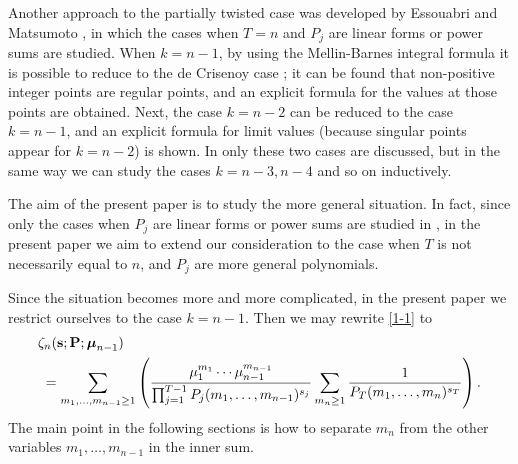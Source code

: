 \documentclass[a4paper,12pt]{article}
\theoremstyle{definition}
\numberwithin{equation}{section}
\begin{document}
Another approach to the partially twisted case was developed by Essouabri and 
Matsumoto \cite{CMUSP}, 
in which the cases when $T=n$ and $P_j$ are linear forms or power sums are studied.
When $k=n-1$, by using the Mellin-Barnes integral formula it is possible to reduce to the
de Crisenoy case \cite{dC}; it can be found that non-positive integer points are regular points, and
an explicit formula for the values at those points are obtained.   Next, the case $k=n-2$ 
can be reduced to the case $k=n-1$, and an explicit formula for limit values (because
singular points appear for $k=n-2$) is shown.    In \cite{CMUSP} only these two cases are
discussed, but in the same way we can study the cases $k=n-3, n-4$ and so on inductively.

The aim of the present paper is to study the more general situation.   In fact,
since only the cases when $P_j$ are linear forms or power sums are studied in \cite{CMUSP},
in the present paper we aim to extend our consideration to the case when $T$ is not necessarily equal to $n$, and $P_j$ are more general polynomials.

Since the situation becomes more and more complicated, in the present paper we 
restrict ourselves to the case $k=n-1$.
Then we may rewrite \eqref{1-1} to
\begin{align}\label{1-4}
&\zeta_n(\mathbf{s};\mathbf{P};\boldsymbol{\mu}_{n-1})\notag\\
&\;=\sum_{m_1,\ldots,m_{n-1}\geq 1}
\left(\frac{\mu_1^{m_1}\cdots \mu_{n-1}^{m_{n-1}}}
{\prod_{j=1}^{T-1}P_j(m_1,\ldots,m_{n-1})^{s_j}}\sum_{m_n\geq 1}\frac{1}{P_T(m_1,\ldots,m_n)^{s_T}}\right).
\end{align}
The main point in the following sections is how to separate $m_n$ from the other variables 
$m_1,\ldots,m_{n-1}$ in the inner sum.
\end{document}
